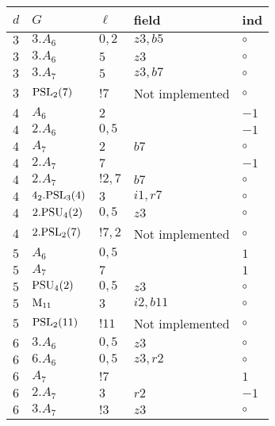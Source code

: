 \documentclass[a4paper, 11pt]{article}
\begin{document}
	\begin{longtable}{lllll} \hline
		$ d $ & $ G $ & $ \ell $ & field & ind \\ \hline \hline
        $ 3 $ & $ 3.A_{6} $ & $ 0,2 $ & $ z3, b5 $ &  $\circ$ \\ \hline
        $ 3 $ & $ 3.A_{6} $ & $ 5 $ & $ z3 $ &  $\circ$ \\ \hline
        $ 3 $ & $ 3.A_{7} $ & $ 5 $ & $ z3, b7 $ &  $\circ$ \\ \hline
        $ 3 $ & $ {\rm PSL}_{2}(7) $ & $ !7 $ &  Not implemented &  $\circ$ \\ \hline
        $ 4 $ & $ A_{6} $ & $ 2 $ & $ ~ $ & $ -1$ \\ \hline
        $ 4 $ & $ 2.A_{6} $ & $ 0,5 $ & $ ~ $ & $ -1$ \\ \hline
        $ 4 $ & $ A_{7} $ & $ 2 $ & $ b7 $ &  $\circ$ \\ \hline
        $ 4 $ & $ 2.A_{7} $ & $ 7 $ & $ ~ $ & $ -1$ \\ \hline
        $ 4 $ & $ 2.A_{7} $ & $ ! 2,7 $ & $ b7 $ &  $\circ$ \\ \hline
        $ 4 $ & $ 4_2.{\rm PSL}_{3}(4) $ & $ 3 $ & $ i1, r7 $ &  $\circ$ \\ \hline
        $ 4 $ & $ 2.{\rm PSU}_{4}(2) $ & $ 0,5 $ & $ z3 $ &  $\circ$ \\ \hline
        $ 4 $ & $ 2.{\rm PSL}_{2}(7) $ & $ !7, 2 $ &  Not implemented &  $\circ$ \\ \hline
        $ 5 $ & $ A_{6} $ & $ 0,5 $ & $ ~ $ & $ 1$ \\ \hline
        $ 5 $ & $ A_{7} $ & $ 7 $ & $ ~ $ & $ 1$ \\ \hline
        $ 5 $ & $ {\rm PSU}_{4}(2) $ & $ 0,5 $ & $ z3 $ &  $\circ$ \\ \hline
        $ 5 $ & $ {\rm M}_{11} $ & $ 3 $ & $ i2, b11 $ &  $\circ$ \\ \hline
        $ 5 $ & $ {\rm PSL}_{2}(11) $ & $ !11 $ &  Not implemented &  $\circ$ \\ \hline
        $ 6 $ & $ 3.A_{6} $ & $ 0,5 $ & $ z3 $ &  $\circ$ \\ \hline
        $ 6 $ & $ 6.A_{6} $ & $ 0,5 $ & $ z3, r2 $ &  $\circ$ \\ \hline
        $ 6 $ & $ A_{7} $ & $ ! 7 $ & $ ~ $ & $ 1$ \\ \hline
        $ 6 $ & $ 2.A_{7} $ & $ 3 $ & $ r2 $ & $ -1$ \\ \hline
        $ 6 $ & $ 3.A_{7} $ & $ ! 3 $ & $ z3 $ &  $\circ$ \\ \hline

\end{longtable}
\end{document}
